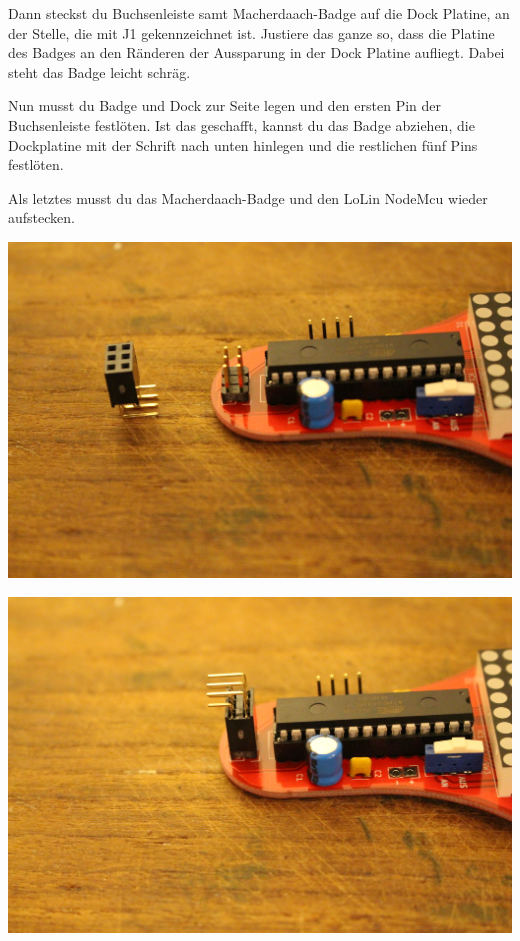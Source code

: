 \documentclass{article}
\begin{document}
Dann steckst du Buchsenleiste samt Macherdaach-Badge auf die Dock Platine, an der Stelle, die mit J1 gekennzeichnet ist. Justiere das ganze so, dass die Platine des Badges an den Ränderen der Aussparung in der Dock Platine aufliegt. Dabei steht das Badge leicht schräg.

Nun musst du Badge und Dock zur Seite legen und den ersten Pin der Buchsenleiste festlöten. Ist das geschafft, kannst du das Badge abziehen, die Dockplatine mit der Schrift nach unten hinlegen und die restlichen fünf Pins festlöten.

Als letztes musst du das Macherdaach-Badge und den LoLin NodeMcu wieder aufstecken.

\vspace{1cm}

\begin{minipage}[b]{0.5\textwidth}
	\includegraphics[width=\textwidth]{Bilder2019/IMG_6482.JPG}
\end{minipage}
\begin{minipage}[b]{0.5\textwidth}
	\includegraphics[width=\textwidth]{Bilder2019/IMG_6483.JPG}
\end{minipage}
\end{document}
